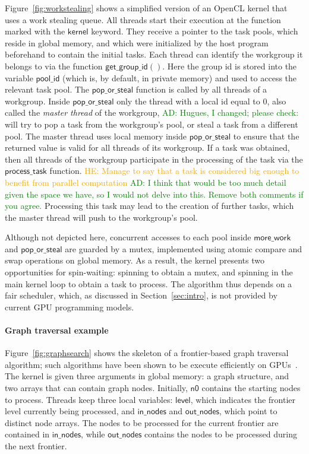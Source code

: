 \documentclass[numbers,nocopyrightspace,10pt]{sigplanconf}
\newcommand{\ADComment}[1]{\textcolor{green}{AD: #1}}
\newcommand{\HEComment}[1]{\textcolor{orange}{HE: #1}}
\newcommand{\myfiglong}{Figure~}
\newcommand{\getgroupid}{\mathsf{get\_group\_id}}
\newcommand{\keyword}[1]{\mathsf{#1}}
\begin{document}
\myfiglong\ref{fig:workstealing} shows a simplified version of an OpenCL
kernel that uses a work stealing queue. All threads start their execution at the
function marked with the $\mathsf{kernel}$ keyword. They receive a
pointer to the task pools, which reside in global memory, and which
were initialized by the host program beforehand to contain the initial
tasks. Each thread can identify the workgroup it belongs to via the
function $\getgroupid()$.  Here the group id is stored into the
variable $\mathsf{pool\_id}$ (which is, by default, in private memory)
and used to access the relevant task pool. The
$\mathsf{pop\_or\_steal}$ function is called by all threads of a
workgroup.  Inside $\mathsf{pop\_or\_steal}$ only the thread with a local id equal to
$0$, also called the \emph{master thread} of the workgroup,
\ADComment{Hugues, I changed; please check:} will try to pop a task
from the workgroup's pool, or steal a task from a different pool. The
master thread uses local memory inside $\mathsf{pop\_or\_steal}$ to
ensure that the returned value is valid for all threads of its
workgroup. If a task was obtained, then all threads of the workgroup
participate in the processing of the task via the
$\mathsf{process\_task}$ function. \HEComment{Manage to say that a
  task is considered big enough to benefit from parallel computation}
\ADComment{I think that would be too much detail given the space we
  have, so I would not delve into this. Remove both comments if you
  agree.} Processing this task may lead to the creation of further
tasks, which the master thread will push to the workgroup's pool.

Although not depicted here, concurrent accesses to each pool inside
$\mathsf{more\_work}$ and $\mathsf{pop\_or\_steal}$ are guarded by a
mutex, implemented using atomic compare and swap operations on
global memory.  As a result, the kernel presents two opportunities for
spin-waiting: spinning to obtain a mutex, and spinning in the main
kernel loop to obtain a task to process.  The algorithm thus depends
on a fair scheduler, which, as discussed in Section~\ref{sec:intro},
is not provided by current GPU programming models.

\paragraph{Graph traversal example} Figure~\ref{fig:graphsearch} shows the
skeleton of a frontier-based graph traversal algorithm; such algorithms have
been shown to be execute efficiently on GPUs~\cite{...}.
The kernel is
given three arguments in global memory: a graph structure, and two
arrays that can contain graph nodes. Initially, $\keyword{n0}$ contains the
starting nodes to process. Threads keep three local variables: $\keyword{level}$, which indicates the frontier level currently being
processed, and $\keyword{in\_nodes}$ and $\keyword{out\_nodes}$, which point to
distinct node arrays. The nodes to be
processed for the current frontier are contained in $\keyword{in\_nodes}$, while $\keyword{out\_nodes}$ contains
the nodes to be processed during the next frontier.
\end{document}
